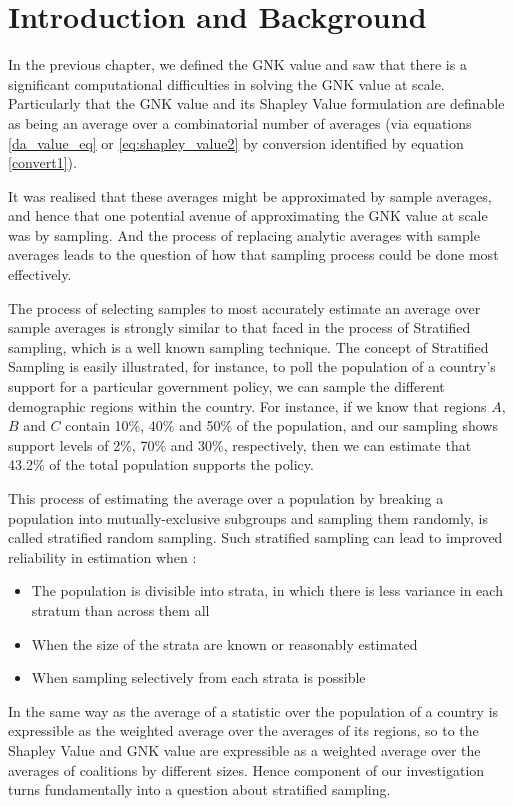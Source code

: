 \section{Introduction and Background}

In the previous chapter, we defined the GNK value and saw that there is a significant computational difficulties in solving the GNK value at scale.
Particularly that the GNK value and its Shapley Value formulation are definable as being an average over a combinatorial number of averages (via equations \ref{da_value_eq} or \ref{eq:shapley_value2} by conversion identified by equation \ref{convert1}).

It was realised that these averages might be approximated by sample averages, and hence that one potential avenue of approximating the GNK value at scale was by sampling.
And the process of replacing analytic averages with sample averages leads to the question of how that sampling process could be done most effectively.

The process of selecting samples to most accurately estimate an average over sample averages is strongly similar to that faced in the process of Stratified sampling, which is a well known sampling technique.
The concept of Stratified Sampling is easily illustrated, for instance, to poll the population of a country's support for a particular government policy, we can sample the different demographic regions within the country.
For instance, if we know that regions $A$,$B$ and $C$ contain 10\%, 40\% and 50\% of the population, and our sampling shows support levels of 2\%, 70\% and 30\%, respectively, then we can estimate that 43.2\% of the total population supports the policy.

This process of estimating the average over a population by breaking a population into mutually-exclusive subgroups and sampling them randomly, is called stratified random sampling.
Such stratified sampling can lead to improved reliability in estimation when \cite{1938.10503378,10.2307/23339498}:
\begin{itemize}
\item The population is divisible into strata, in which there is less variance in each stratum than across them all 
\item When the size of the strata are known or reasonably estimated
\item When sampling selectively from each strata is possible 
\end{itemize}

In the same way as the average of a statistic over the population of a country is expressible as the weighted average over the averages of its regions, so to the Shapley Value and GNK value are expressible as a weighted average over the averages of coalitions by different sizes.
Hence component of our investigation turns fundamentally into a question about stratified sampling.

